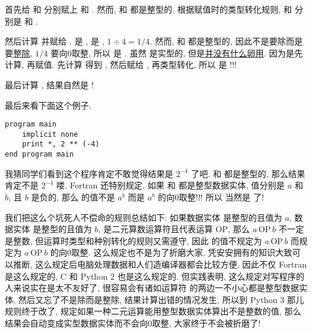 首先给  和  分别赋上  和 . 然而,  和  都是整型的. 根据赋值时的类型转化规则,  和  分别是  和 .

然后计算  并赋给 .  是 ,  是 , $1\div 4=1/4$. 然而,  和  都是整型的, 因此不是要除而是要\uline{整除}, $1/4$ 要向0取整, 所以  是 . 虽然  是实型的, 但是\uline{并没有什么卵用}. 因为是先计算, 再赋值. 先计算  得到 , 然后赋给 , 再类型转化, 所以  是 !!!

最后计算 , 结果自然是 !

最后来看下面这个例子.
\begin{lstlisting}
program main
    implicit none
    print *, 2 ** (-4)
end program main
\end{lstlisting}

我猜同学们看到这个程序肯定不敢觉得结果是 $2^{-4}$ 了吧.  和  都是整型的, 那么结果肯定不是 $2^{-4}$ 喽. Fortran 还特别规定, 如果 \ttt{[a]} 和 \ttt{[b]} 都是整型数据实体, 值分别是 $a$ 和 $b$, 且 $b$ 是负的, 那么 \ttt{[a]**[b]} 的值不是 $a^b$ 而是 $a^b$ 的向0取整!!! 所以  当然是  了!

我们把这么个坑死人不偿命的规则总结如下: 如果数据实体 \ttt{[a]} 是整型的且值为 $a$, 数据实体 \ttt{[b]} 是整型的且值为 $b$, \ttt{[op]} 是二元算数运算符且代表运算 $\text{OP}$, 那么 $a\,\text{OP}\,b$ 不一定是整数, 但运算时类型和种别转化的规则又需遵守, 因此 \ttt{[a][op][b]} 的值不规定为 $a\,\text{OP}\,b$ 而规定为 $a\,\text{OP}\,b$ 的向0取整. 这么规定也不是为了折磨大家, 凭安安拥有的知识大致可以推断, 这么规定后电脑处理数据和人们造编译器都会比较方便, 因此不仅 Fortran 是这么规定的, C 和 Python 2 也是这么规定的. 但实践表明, 这么规定对写程序的人来说实在是太不友好了, 很容易会有诸如运算符 \ttt{/} 的两边一不小心都是整型数据实体, 然后又忘了不是除而是整除, 结果计算出错的情况发生, 所以到 Python 3 那儿规则终于改了, 规定如果一种二元运算能用整型数据实体算出不是整数的值, 那么结果会自动变成实型数据实体而不会向0取整, 大家终于不会被折磨了!


